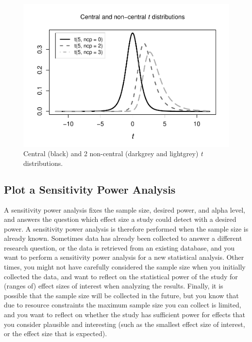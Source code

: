 \documentclass[
  english,
  ,jou,floatsintext]{apa6}
\begin{document}
\begin{figure}
\centering
\includegraphics{sample_size_justification_files/figure-latex/noncentralt-1.pdf}
\caption{\label{fig:noncentralt}Central (black) and 2 non-central (darkgrey and lightgrey) \emph{t} distributions.}
\end{figure}

\hypertarget{plot-a-sensitivity-power-analysis}{%
\subsection{Plot a Sensitivity Power Analysis}\label{plot-a-sensitivity-power-analysis}}

A sensitivity power analysis fixes the sample size, desired power, and alpha level, and answers the question which effect size a study could detect with a desired power. A sensitivity power analysis is therefore performed when the sample size is already known. Sometimes data has already been collected to answer a different research question, or the data is retrieved from an existing database, and you want to perform a sensitivity power analysis for a new statistical analysis. Other times, you might not have carefully considered the sample size when you initially collected the data, and want to reflect on the statistical power of the study for (ranges of) effect sizes of interest when analyzing the results. Finally, it is possible that the sample size will be collected in the future, but you know that due to resource constraints the maximum sample size you can collect is limited, and you want to reflect on whether the study has sufficient power for effects that you consider plausible and interesting (such as the smallest effect size of interest, or the effect size that is expected).
\end{document}
